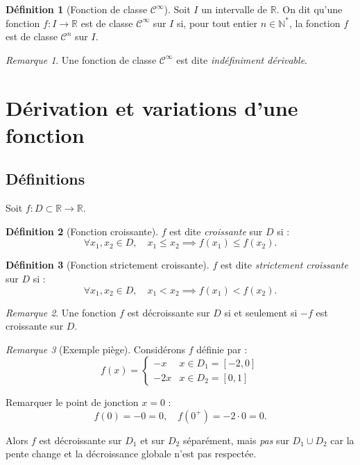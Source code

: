\documentclass{report} %
\theoremstyle{definition}  %
\newtheorem{definition}{Définition}[chapter] %
\theoremstyle{plain} %
\theoremstyle{remark} %
\newtheorem*{remark}{Remarque} %
\begin{document}
\begin{definition}[Fonction de classe \(\mathcal{C}^\infty\)]
Soit \(I\) un intervalle de \(\mathbb{R}\).
On dit qu'une fonction \(f : I \to \mathbb{R}\) est de classe \(\mathcal{C}^\infty\) sur \(I\) si, pour tout entier \(n \in \mathbb{N}^*\), la fonction \(f\) est de classe \(\mathcal{C}^n\) sur \(I\).
\end{definition}

\begin{remark}
Une fonction de classe \(\mathcal{C}^\infty\) est dite \emph{indéfiniment dérivable}.
\end{remark}


\section{Dérivation et variations d'une fonction}

\subsection{Définitions}

Soit \(f : D \subset \mathbb{R} \to \mathbb{R}\).

\begin{definition}[Fonction croissante]
\(f\) est dite \emph{croissante} sur \(D\) si :
\[
\forall x_1, x_2 \in D, \quad x_1 \le x_2 \implies f(x_1) \le f(x_2).
\]
\end{definition}

\begin{definition}[Fonction strictement croissante]
\(f\) est dite \emph{strictement croissante} sur \(D\) si :
\[
\forall x_1, x_2 \in D, \quad x_1 < x_2 \implies f(x_1) < f(x_2).
\]
\end{definition}

\begin{remark}
Une fonction \(f\) est décroissante sur \(D\) si et seulement si \(-f\) est croissante sur \(D\).
\end{remark}

\begin{remark}[Exemple piège]
Considérons \(f\) définie par :
\[
f(x) = 
\begin{cases}
- x & x \in D_1 = [-2,0] \\
- 2x & x \in D_2 = [0,1]
\end{cases}
\]

Remarquer le point de jonction \(x=0\) :
\[
f(0) = -0 = 0, \quad f(0^+) = -2\cdot 0 = 0.
\]

Alors \(f\) est décroissante sur \(D_1\) et sur \(D_2\) séparément, mais \emph{pas} sur \(D_1 \cup D_2\) car la pente change et la décroissance globale n’est pas respectée.
\end{remark}
\end{document}
